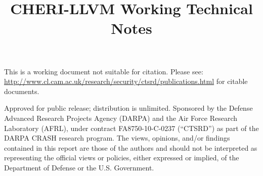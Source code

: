 \documentclass[10pt,a4paper]{book}
\title{CHERI-LLVM Working Technical Notes}
\begin{document}
\begin{minipage}[h]{\textwidth}
\maketitle

This is a working document not suitable for citation.  Please see:\\ \url{http://www.cl.cam.ac.uk/research/security/ctsrd/publications.html} for citable documents.

\vspace{2in}
{\footnotesize
Approved for public release; distribution is unlimited.
Sponsored by the Defense Advanced Research Projects Agency (DARPA) and the
Air Force Research Laboratory (AFRL), under contract FA8750-10-C-0237
(``CTSRD'') as part of the DARPA CRASH research program.
The views, opinions, and/or findings contained in this report are those of the
authors and should not be interpreted as representing the official views or
policies, either expressed or implied, of the Department of Defense or the
U.S. Government.
}
\end{minipage}
\normalsize
\clearpage
\tableofcontents







\printindex
\end{document}
